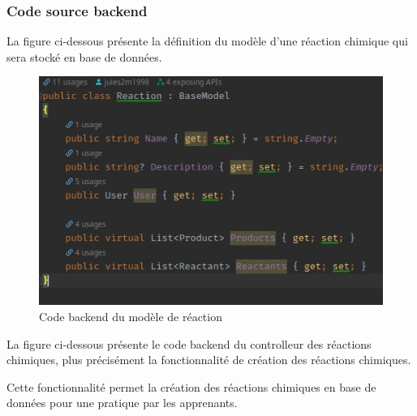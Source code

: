 \subsubsection{Code source backend}

La figure ci-dessous présente la définition du modèle d'une réaction chimique qui sera stocké en base de données.


\begin{figure}[H]
	\centering
	\includegraphics[width=1\textwidth]{img/mre}
	\caption{Code backend du modèle de réaction}
\end{figure}

La figure ci-dessous présente le code backend du controlleur des réactions chimiques, plus précisément la fonctionnalité de création des réactions chimiques.

Cette fonctionnalité permet la création des réactions chimiques en base de données pour une pratique par les apprenants.

